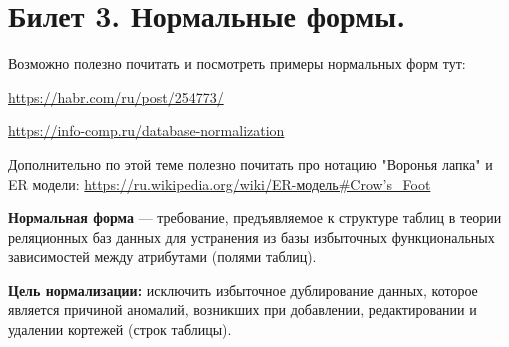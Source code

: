 \newpage
\section {Билет 3. Нормальные формы.}

Возможно полезно почитать и посмотреть примеры нормальных форм тут:

\url{https://habr.com/ru/post/254773/} 

\url{https://info-comp.ru/database-normalization}

Дополнительно по этой теме полезно почитать про нотацию "Воронья лапка" и ER модели: \url{https://ru.wikipedia.org/wiki/ER-модель#Crow’s_Foot}

\textbf{Нормальная форма} — требование, предъявляемое к структуре таблиц в теории реляционных баз данных для устранения из базы избыточных функциональных зависимостей между атрибутами (полями таблиц).

\textbf{Цель нормализации:} исключить избыточное дублирование данных, которое является причиной аномалий, возникших при добавлении, редактировании и удалении кортежей (строк таблицы).

